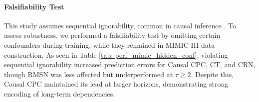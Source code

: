 \documentclass{article}
\theoremstyle{plain}
\theoremstyle{definition}
\theoremstyle{remark}
\begin{document}
\paragraph{Falsifiability Test}
This study assumes sequential ignorability, common in causal inference \cite{lim2018RMSM, bica2020estimatingCRN, Li2021GNetAR, Melnychuk2022CausalTF}. To assess robustness, we performed a falsifiability test by omitting certain confounders during training, while they remained in MIMIC-III data construction. As seen in Table \ref{tab: perf_mimic_hidden_conf}, violating sequential ignorability increased prediction errors for Causal CPC, CT, and CRN, though RMSN was less affected but underperformed at \(\tau \geq 2\). Despite this, Causal CPC maintained its lead at larger horizons, demonstrating strong encoding of long-term dependencies.
\vspace{-0.5cm}
\begin{table}[!htbp]
\centering
\caption{Results on the MIMIC III when sequential ignorability is violated reported by RMSEs}
\label{tab: perf_mimic_hidden_conf}
\end{table}
\vspace{-0.5cm}
\end{document}
